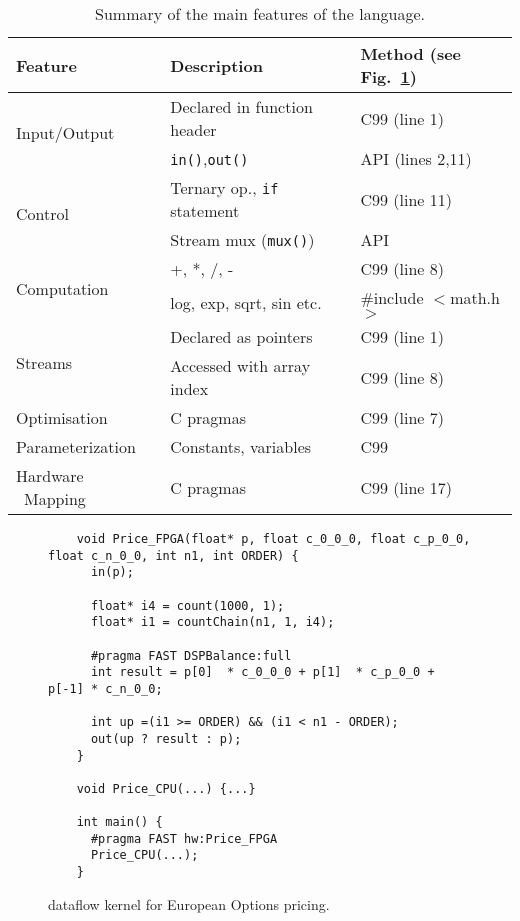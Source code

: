 \begin{table}[!h]
  \centering
\renewcommand{\arraystretch}{1.6}
\caption{Summary of the main features of the \FAST{} language.}
\label{table:maxc-features}
\begin{tabular}{p{1.7cm}|l|l}
\hline
\bf{Feature}                   & \bf{Description}                   & \bf{Method (see Fig.~\ref{fig:maxc-1dconv})} \\
\hline\hline
  \multirow{2}{*}{Input/Output}         & Declared in function header          & C99 (line 1)                                 \\\cline{2-3}       & \texttt{in()},\texttt{out()}  & \FAST{} API (lines 2,11) \\
\hline
  \multirow{2}{*}{Control}     & Ternary op., \texttt{if} statement & C99 (line 11)                                \\\cline{2-3}      & Stream mux (\texttt{mux()})       & \FAST{} API  \\
\hline
\multirow{2}{*}{Computation} & +, *, /, -                         & C99 (line 8)                           \\\cline{2-3} & log, exp, sqrt, sin etc.  & \#include $<$math.h$>$  \\
\hline
  \multirow{2}{*}{Streams}     & Declared as pointers               & C99 (line 1)                                 \\\cline{2-3}       & Accessed with array index & C99 (line 8) \\
\hline
  Optimisation                 & C pragmas                   & C99 (line 7)                                 \\
\hline
  Parameterization             & Constants, variables                   & C99                                          \\
\hline
Hardware \  Mapping                  & C pragmas                   & C99 (line 17)                                \\
\end{tabular}
\end{table}



\lstset{style=MaxC}

\begin{figure}[!h]
  \begin{lstlisting}
    void Price_FPGA(float* p, float c_0_0_0, float c_p_0_0, float c_n_0_0, int n1, int ORDER) {
      in(p);

      float* i4 = count(1000, 1);
      float* i1 = countChain(n1, 1, i4);

      #pragma FAST DSPBalance:full
      int result = p[0]  * c_0_0_0 + p[1]  * c_p_0_0 + p[-1] * c_n_0_0;

      int up =(i1 >= ORDER) && (i1 < n1 - ORDER);
      out(up ? result : p);
    }

    void Price_CPU(...) {...}

    int main() {
      #pragma FAST hw:Price_FPGA
      Price_CPU(...);
    }
  \end{lstlisting}
  \caption{\FAST{} dataflow kernel for European Options
    pricing.}
  \label{fig:maxc-1dconv}
\end{figure}


